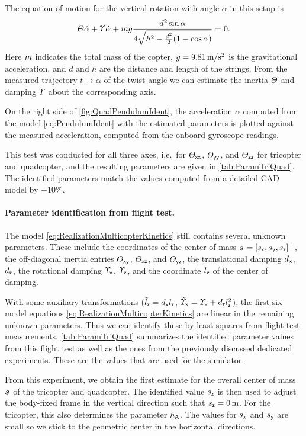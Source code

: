 The equation of motion for the vertical rotation with angle $\alpha$ in this setup is
\begin{align}\label{eq:PendulumIdent}
 \varTheta \ddot{\alpha} + \varUpsilon \dot{\alpha} + m g \frac{d^2 \sin\alpha}{4\sqrt{h^2 - \tfrac{d^2}{2}(1-\cos\alpha)}} = 0.
\end{align}
Here $m$ indicates the total mass of the copter, $g = 9.81\,\text{m} / \text{s}^2$ is the gravitational acceleration, and $d$ and $h$ are the distance and length of the strings.
From the measured trajectory $t\mapsto\alpha$ of the twist angle we can estimate the inertia $\varTheta$ and damping $\varUpsilon$ about the corresponding axis.

On the right side of \autoref{fig:QuadPendulumIdent}, the acceleration $\ddot{\alpha}$ computed from the model \eqref{eq:PendulumIdent} with the estimated parameters is plotted against the measured acceleration, computed from the onboard gyroscope readings.

This test was conducted for all three axes, i.e.\ for $\varTheta_{\mathsf{x}\mathsf{x}}$, $\varTheta_{\mathsf{y}\mathsf{y}}$, and $\varTheta_{\mathsf{z}\mathsf{z}}$ for tricopter and quadcopter, and the resulting parameters are given in \autoref{tab:ParamTriQuad}.
The identified parameters match the values computed from a detailed CAD model by $\pm 10\%$.

\paragraph*{Parameter identification from flight test.}
The model \eqref{eq:RealizationMulticopterKinetics} still contains several unknown parameters.
These include the coordinates of the center of mass $\bodyCOM{}{}{} = [\sx, \sy, \sz]^\top$, the off-diagonal inertia entries $\varTheta_{\mathsf{x}\mathsf{y}}$, $\varTheta_{\mathsf{x}\mathsf{z}}$, and $\varTheta_{\mathsf{y}\mathsf{z}}$, the translational damping $d_{\mathsf{x}}$, $d_{\mathsf{z}}$, the rotational damping $\varUpsilon_{\mathsf{x}}$, $\varUpsilon_{\mathsf{z}}$, and the coordinate $l_{\mathsf{z}}$ of the center of damping.

With some auxiliary transformations ($\tilde{l}_{\mathsf{z}} = d_{\mathsf{x}}l_{\mathsf{z}}$, $\tilde{\varUpsilon}_{\mathsf{x}} = \varUpsilon_{\mathsf{x}} + d_{\mathsf{z}}l_{\mathsf{z}}^2$), the first six model equations \eqref{eq:RealizationMulticopterKinetics} are linear in the remaining unknown parameters.
Thus we can identify these by least squares from flight-test measurements.
\autoref{tab:ParamTriQuad} summarizes the identified parameter values from this flight test as well as the ones from the previously discussed dedicated experiments.
These are the values that are used for the simulator.

From this experiment, we obtain the first estimate for the overall center of mass $\bodyCOM{}{}{}$ of the tricopter and quadcopter.
The identified value $s_{\mathsf{z}}$ is then used to adjust the body-fixed frame in the vertical direction such that $s_{\mathsf{z}}=0\,\text{m}$.
For the tricopter, this also determines the parameter $h_{\mathsf{A}}$.
The values for $s_{\mathsf{x}}$ and $s_{\mathsf{y}}$ are small so we stick to the geometric center in the horizontal directions.

